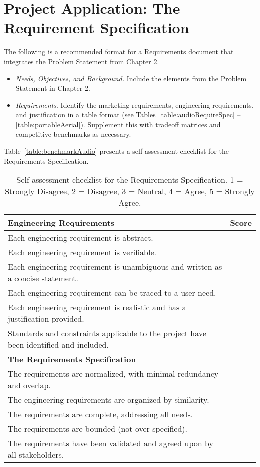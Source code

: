 \section{Project Application: The Requirement Specification}
\label{section:project-application-the-requirements-specification}

The following is a recommended format for a Requirements document that
integrates the Problem Statement from Chapter 2.

\begin{itemize}
\item
  \emph{Needs, Objectives, and Background.} Include the elements from
  the Problem Statement in Chapter 2.
\item
  \emph{Requirements}. Identify the marketing requirements, engineering
  requirements, and justification in a table format (see Tables~\ref{table:audioRequireSpec} --
  \ref{table:portableAerial}). Supplement this with tradeoff matrices and competitive
  benchmarks as necessary.
\end{itemize}

Table~\ref{table:benchmarkAudio} presents a self-assessment checklist for the Requirements
 Specification.
  
\begin{table}[h]
\centering
\caption{Self-assessment checklist for the Requirements
Specification. 1 = Strongly Disagree, 2 = Disagree, 3 = Neutral, 4 =
Agree, 5 = Strongly Agree.}

\label{table:requirementsCheckList}
\begin{tabular}{ |p{10cm}|l|} 
\hline
\rowcolor{Gray}
\textbf{Engineering Requirements} & \textbf{Score}\\ \hline
Each engineering requirement is abstract. & \\ \hline
Each engineering requirement is verifiable. & \\ \hline
Each engineering requirement is unambiguous and written as a concise
statement. & \\ \hline
Each engineering requirement can be traced to a user need. & \\ \hline
Each engineering requirement is realistic and has a justification
provided. & \\ \hline
Standards and constraints applicable to the project have been identified
and included. & \\ \hline

\rowcolor{Gray}
\textbf{The Requirements Specification} & \\ \hline
The requirements are normalized, with minimal redundancy and overlap.
& \\ \hline
The engineering requirements are organized by similarity. & \\ \hline
The requirements are complete, addressing all needs. & \\ \hline
The requirements are bounded (not over-specified). & \\ \hline
The requirements have been validated and agreed upon by all
stakeholders. & \\ \hline
\end{tabular}
\end{table}

